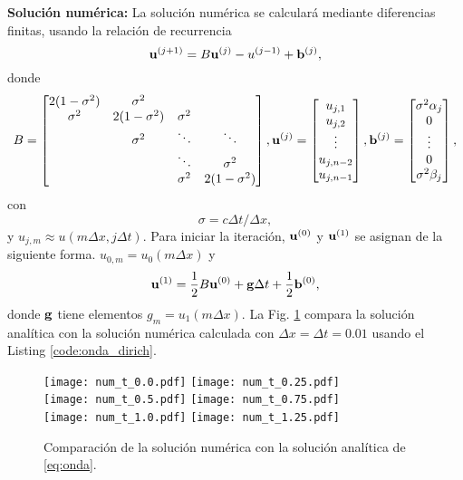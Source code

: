 \documentclass[11pt]{article}
\begin{document}
{\bf Soluci\'on num\'erica:} La soluci\'on num\'erica se calcular\'a mediante diferencias finitas, usando la relaci\'on de recurrencia
\begin{equation}
  \label{eq:1}
  {\bf u}^{(j+1)} = B{\bf u}^{(j)} - u^{(j-1)} + {\bf b}^{(j)},
\end{equation}
donde
\begin{equation}
  \label{eq:11}
  B =
  \begin{bmatrix}
    2(1-\sigma^2) & \sigma^2      &                      \\
    \sigma^2      & 2(1-\sigma^2) & \sigma^2             \\
                  & \sigma^2      & \ddots     & \ddots  \\
                  &               & \ddots     & \sigma^2 \\
                  &               & \sigma^2   & 2(1-\sigma^2)
  \end{bmatrix},
  {\bf u}^{(j)} =
  \begin{bmatrix}
    u_{j,1} \\
    u_{j,2} \\
    \vdots \\
    u_{j,n-2} \\
    u_{j,n-1}
  \end{bmatrix},
  {\bf b}^{(j)} =
  \begin{bmatrix}
    \sigma^2\alpha_j \\
    0 \\
    \vdots \\
    0 \\
    \sigma^2\beta_j
  \end{bmatrix},
\end{equation}
con
\begin{equation}
  \label{eq:12}
  \sigma = c\Delta t/\Delta x,
\end{equation}
y $u_{j,m} \approx u(m\Delta x, j\Delta t)$. Para iniciar la iteraci\'on, ${\bf u}^{(0)}$ y ${\bf u}^{(1)}$ se asignan de la siguiente forma. $u_{0,m} = u_0(m\Delta x)$ y 
\begin{equation}
  \label{eq:13}
  {\bf u}^{(1)} = \frac{1}{2}B{\bf u}^{(0)} + {\bf g}\Delta t + \frac{1}{2}{\bf b}^{(0)},
\end{equation}
donde ${\bf g}$ tiene elementos $g_m = u_1(m\Delta x)$. La Fig. \ref{fig:num} compara la soluci\'on anal\'itica con la soluci\'on  num\'erica calculada con $\Delta x=\Delta t=0.01$ usando el Listing \ref{code:onda_dirich}.
\begin{figure}[h]
  \centering
    \texttt{[image: num\_t\_0.0.pdf]} 
  \texttt{[image: num\_t\_0.25.pdf]} \\
  \texttt{[image: num\_t\_0.5.pdf]} 
  \texttt{[image: num\_t\_0.75.pdf]} \\
  \texttt{[image: num\_t\_1.0.pdf]}
  \texttt{[image: num\_t\_1.25.pdf]}
  \caption{Comparaci\'on de la soluci\'on num\'erica con la soluci\'on anal\'itica de \eqref{eq:onda}.}
  \label{fig:num}
\end{figure}


\end{document}

